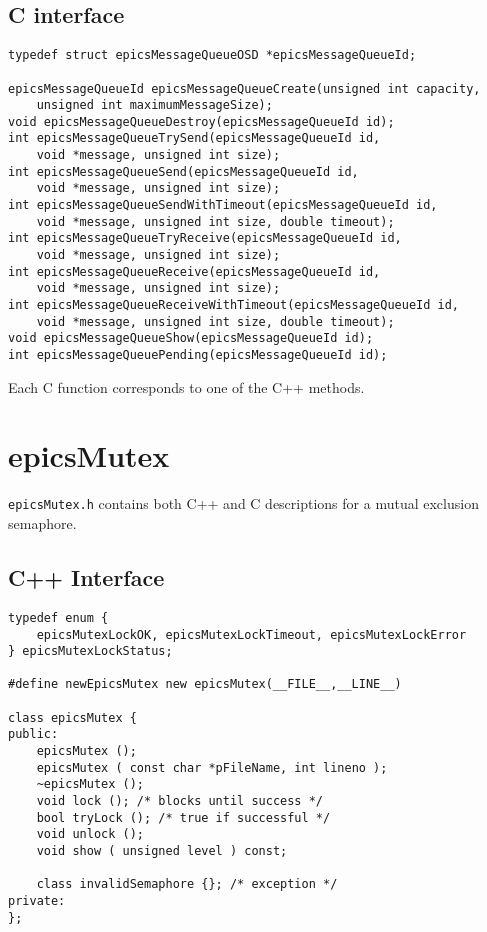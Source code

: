 \subsection{C interface}

\begin{verbatim}
typedef struct epicsMessageQueueOSD *epicsMessageQueueId;

epicsMessageQueueId epicsMessageQueueCreate(unsigned int capacity,
    unsigned int maximumMessageSize);
void epicsMessageQueueDestroy(epicsMessageQueueId id);
int epicsMessageQueueTrySend(epicsMessageQueueId id,
    void *message, unsigned int size);
int epicsMessageQueueSend(epicsMessageQueueId id,
    void *message, unsigned int size);
int epicsMessageQueueSendWithTimeout(epicsMessageQueueId id,
    void *message, unsigned int size, double timeout);
int epicsMessageQueueTryReceive(epicsMessageQueueId id,
    void *message, unsigned int size);
int epicsMessageQueueReceive(epicsMessageQueueId id,
    void *message, unsigned int size);
int epicsMessageQueueReceiveWithTimeout(epicsMessageQueueId id,
    void *message, unsigned int size, double timeout);
void epicsMessageQueueShow(epicsMessageQueueId id);
int epicsMessageQueuePending(epicsMessageQueueId id);
\end{verbatim}

Each C function corresponds to one of the C++ methods.

\section{epicsMutex}

\verb|epicsMutex.h| contains both C++ and C descriptions for a mutual exclusion semaphore.

\subsection{C++ Interface}

\begin{verbatim}
typedef enum {
    epicsMutexLockOK, epicsMutexLockTimeout, epicsMutexLockError
} epicsMutexLockStatus;

#define newEpicsMutex new epicsMutex(__FILE__,__LINE__)

class epicsMutex {
public:
    epicsMutex ();
    epicsMutex ( const char *pFileName, int lineno );
    ~epicsMutex ();
    void lock (); /* blocks until success */
    bool tryLock (); /* true if successful */
    void unlock ();
    void show ( unsigned level ) const;

    class invalidSemaphore {}; /* exception */
private:
};
\end{verbatim}

